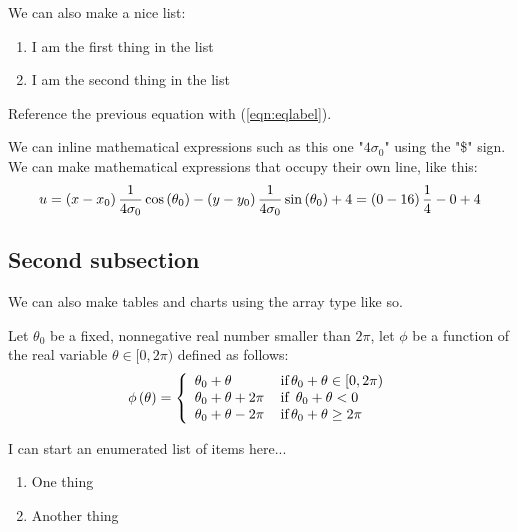 \documentclass[a4paper,12pt]{article} %
\begin{document}
\noindent
We can also make a nice list:

\vspace{2mm}
\begin{enumerate}
\item I am the first thing in the list
\item I am the second thing in the list
\end{enumerate}
\vspace{2mm}

Reference the previous equation with (\ref{eqn:eqlabel}).

\noindent
We can inline mathematical expressions such as this one "$4 \sigma_0$" using the "\$" sign. We can make mathematical expressions that occupy their own line, like this: 
\[
u = \left(x - x_0\right) {1 \over 4 \sigma_0} \cos\left(\theta_0\right) - \left(y - y_0\right) {1 \over 4 \sigma_0} \sin\left(\theta_0\right) + 4 = \left(0 - 16\right) \frac{1}{4} - 0 + 4
\]

\subsection{Second subsection}

We can also make tables and charts using the array type like so.

Let $\theta_0$ be a fixed, nonnegative real number smaller than $2\pi$, let $\phi$ be a function of the real variable $\theta \in [0, 2\pi)$ defined as follows:
\vspace{2mm}
\[ \phi \left(\theta\right) = \left\{ 
\begin{array}{l l}
\theta_0 + \theta & \, \textrm{if} \, \theta_0 + \theta \in [0,2 \pi)\\ 
\theta_0 + \theta + 2 \pi & \, \textrm{if} \, \ \theta_0 + \theta < 0\\
\theta_0 + \theta - 2 \pi & \, \textrm{if} \, \theta_0 + \theta \ge 2 \pi\\
\end{array} \right.
\] 
\vspace{2mm}

\noindent
I can start an enumerated list of items here...

\vspace{5mm}
\begin{enumerate}
\item One thing
\item Another thing
\end{enumerate}
\vspace{5mm}
\end{document}
